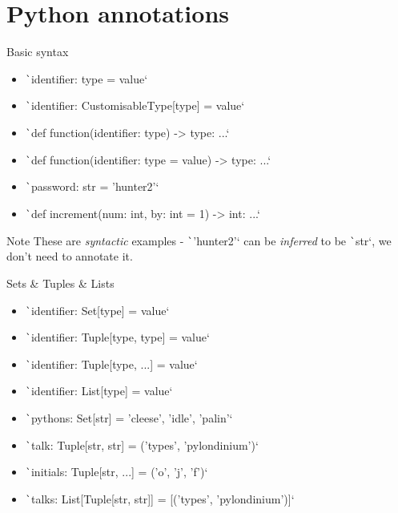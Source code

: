 \documentclass[10pt]{beamer}
\begin{document}
\section{Python annotations}

\begin{frame}{Basic syntax}
    \begin{itemize}[<+->]
        \item \texttt`identifier: type = value`
        \item \texttt`identifier: CustomisableType[type] = value`
        \item \texttt`def function(identifier: type) -> type: ...`
        \item \texttt`def function(identifier: type = value) -> type: ...`
    \end{itemize}

    \pause\begin{examples}
    \begin{itemize}[<+->]
        \item \texttt`password: str = 'hunter2'`
        \item \texttt`def increment(num: int, by: int = 1) -> int: ...`
    \end{itemize}
    \end{examples}

    \pause\begin{alertblock}{Note}
        These are \emph{syntactic} examples - \texttt`'hunter2'` can be \emph{inferred} to be \texttt`str`, we don't need to annotate it.
    \end{alertblock}
\end{frame}

\begin{frame}[shrink=10]{Sets \& Tuples \& Lists}
    \begin{itemize}[<+->]
        \item \texttt`identifier: Set[type] = value`
        \item \texttt`identifier: Tuple[type, type] = value`
        \item \texttt`identifier: Tuple[type, ...] = value`
        \item \texttt`identifier: List[type] = value`
    \end{itemize}

    \pause\begin{examples}
    \begin{itemize}[<+->]
        \item \texttt`pythons: Set[str] = {'cleese', 'idle', 'palin'}`
        \item \texttt`talk: Tuple[str, str] = ('types', 'pylondinium')`
        \item \texttt`initials: Tuple[str, ...] = ('o', 'j', 'f')`
        \item \texttt`talks: List[Tuple[str, str]] = [('types', 'pylondinium')]`
    \end{itemize}
    \end{examples}
\end{frame}
\end{document}
